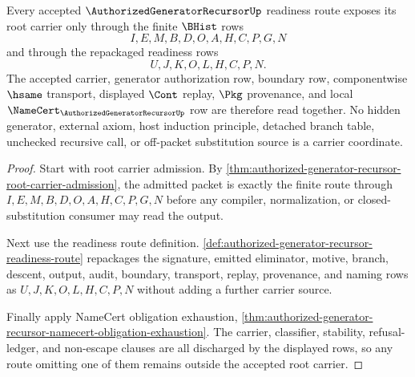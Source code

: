 \begin{theorem}
\label{thm:authorized-generator-recursor-root-carrier-totality}
Every accepted $\AuthorizedGeneratorRecursorUp$ readiness route exposes its root carrier only through the finite $\BHist$ rows
$$
I,E,M,B,D,O,A,H,C,P,G,N
$$
and through the repackaged readiness rows
$$
U,J,K,O,L,H,C,P,N.
$$
The accepted carrier, generator authorization row, boundary row, componentwise $\hsame$ transport, displayed $\Cont$ replay, $\Pkg$ provenance, and local $\NameCert_{\AuthorizedGeneratorRecursorUp}$ row are therefore read together. No hidden generator, external axiom, host induction principle, detached branch table, unchecked recursive call, or off-packet substitution source is a carrier coordinate.
\end{theorem}
\begin{proof}
Start with root carrier admission. By \autoref{thm:authorized-generator-recursor-root-carrier-admission}, the admitted packet is exactly the finite route through $I,E,M,B,D,O,A,H,C,P,G,N$ before any compiler, normalization, or closed-substitution consumer may read the output.

Next use the readiness route definition. \autoref{def:authorized-generator-recursor-readiness-route} repackages the signature, emitted eliminator, motive, branch, descent, output, audit, boundary, transport, replay, provenance, and naming rows as $U,J,K,O,L,H,C,P,N$ without adding a further carrier source.

Finally apply NameCert obligation exhaustion, \autoref{thm:authorized-generator-recursor-namecert-obligation-exhaustion}. The carrier, classifier, stability, refusal-ledger, and non-escape clauses are all discharged by the displayed rows, so any route omitting one of them remains outside the accepted root carrier.
\end{proof}

